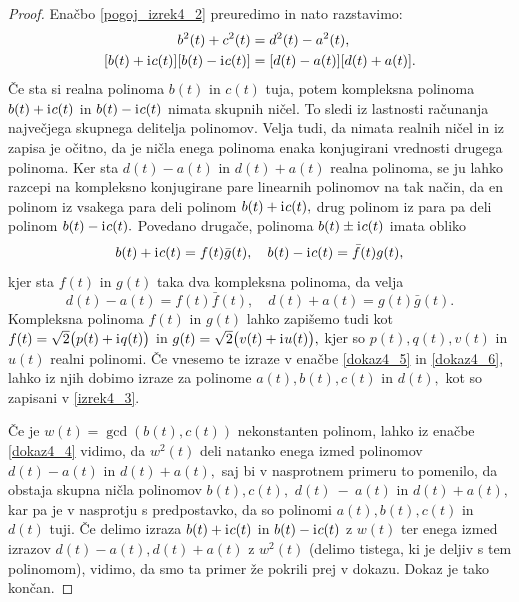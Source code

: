 \documentclass[12pt,a4paper,twoside]{article}
\newcommand{\iu}{\mathrm{i}\mkern1mu} %
\theoremstyle{definition} %
\theoremstyle{plain} %
\theoremstyle{primerstyle}
\numberwithin{equation}{section}  %
\begin{document}
\begin{proof}
	Enačbo \eqref{pogoj_izrek4_2} preuredimo in nato razstavimo:
	\begin{align}
		b^2(t)+c^2(t)&=d^2(t)-a^2(t), \nonumber \\
		[b(t)+\iu c(t)][b(t)-\iu c(t)]&=[d(t)-a(t)][d(t)+a(t)]. \label{dokaz4_4}
	\end{align}
	Če sta si realna polinoma $b(t)$ in $c(t)$ tuja, potem kompleksna polinoma $b(t)+\iu c(t)$ in $b(t)-\iu c(t)$ nimata skupnih ničel. To sledi iz lastnosti računanja največjega skupnega delitelja polinomov. Velja tudi, da nimata realnih ničel in iz zapisa je očitno, da je ničla enega polinoma enaka konjugirani vrednosti drugega polinoma. Ker sta $d(t)-a(t)$ in $d(t)+a(t)$ realna polinoma, se ju lahko razcepi na kompleksno konjugirane pare linearnih polinomov na tak način, da en polinom iz vsakega para deli polinom $b(t)+\iu c(t),$ drug polinom iz para pa deli polinom $b(t)-\iu c(t).$ Povedano drugače, polinoma $b(t) \pm \iu c(t)$ imata obliko
	\begin{equation}
	\label{dokaz4_5}
		b(t)+ \iu c(t)=f(t)\bar{g}(t), \quad b(t)-\iu c(t)=\bar{f}(t)g(t),
	\end{equation}
	kjer sta $f(t)$ in $g(t)$ taka dva kompleksna polinoma, da velja
	\begin{equation}
		\label{dokaz4_6}
		d(t)-a(t)=f(t)\bar{f}(t), \quad d(t)+a(t)=g(t)\bar{g}(t).
	\end{equation}
	Kompleksna polinoma $f(t)$ in $g(t)$ lahko zapišemo tudi kot $f(t)=\sqrt{2}\big(p(t)+\iu q(t)\big)$ in $g(t)=\sqrt{2}\big(v(t)+\iu u(t)\big),$ kjer so $p(t),q(t),v(t)$ in $u(t)$ realni polinomi. Če vnesemo te izraze v enačbe \eqref{dokaz4_5} in \eqref{dokaz4_6}, lahko iz njih dobimo izraze za polinome $a(t),b(t),c(t)$ in $d(t),$ kot so zapisani v \eqref{izrek4_3}.

	Če je $w(t)=\gcd(b(t),c(t))$ nekonstanten polinom, lahko iz enačbe \eqref{dokaz4_4} vidimo, da $w^2(t)$ deli natanko enega izmed polinomov $d(t)-a(t)$ in $d(t)+a(t),$ saj bi v nasprotnem primeru to pomenilo, da obstaja skupna ničla polinomov $b(t),c(t),$ $d(t)~-~a(t)$ in $d(t)+a(t),$ kar pa je v nasprotju s predpostavko, da so polinomi $a(t),b(t),c(t)$ in $d(t)$ tuji. Če delimo izraza $b(t)+\iu c(t)$ in $b(t)-\iu c(t)$ z $w(t)$ ter enega izmed izrazov $d(t)-a(t),d(t)+a(t)$ z $w^2(t)$ (delimo tistega, ki je deljiv s tem polinomom), vidimo, da smo ta primer že pokrili prej v dokazu. Dokaz je tako končan. 
\end{proof}
\end{document}
